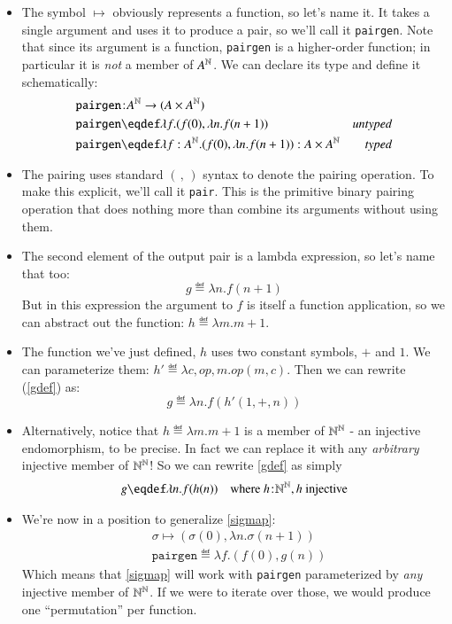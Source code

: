 \begin{itemize}
\item The symbol \(\mapsto\) obviously represents a function, so let's
  name it. It takes a single argument and uses it to produce a pair, so
  we'll call it \texttt{pairgen}. Note that since its argument is a
  function, \texttt{pairgen} is a higher-order function; in particular
  it is \textit{not} a member of \(A^{\mathbb{N}}\). We can declare its
  type and define it schematically:
  \begin{align*}
    & \tj{\texttt{pairgen}}{\exp{A}{\Nat}\fnarrow(A\times\exp{A}{\Nat})} \\
    & \texttt{pairgen}\eqdef\lambda{}f.(f(0),\lambda{}n.f(n+1)) & \textit{untyped} \\
    & \texttt{pairgen}\eqdef\lambda{}f:\exp{A}{\Nat}.(f(0),\lambda{}n.f(n+1)):A\times\exp{A}{\Nat} & \textit{typed}
  \end{align*}
\item The pairing uses standard \((\, ,\, )\) syntax to denote the pairing
  operation. To make this explicit, we'll call it \texttt{pair}. This
  is the primitive binary pairing operation that does nothing more
  than combine its arguments without using them.
\item The second element of the output pair is a lambda expression, so
  let's name that too:
  \begin{equation}
  g\eqdef\lambda{}n.f(n+1) \label{gdef}
  \end{equation}
  But in this expression the argument to \(f\) is itself a function
  application, so we can abstract out the function:
  \(h\eqdef\lambda{}m.m+1\).
\item The function we've just defined, \(h\) uses two constant
  symbols, \(+\) and \(1\). We can parameterize them:
  \(h'\eqdef\lambda{}c,op,m.op(m,c)\). Then we can rewrite (\ref{gdef}) as:
  \begin{equation}
    g\eqdef\lambda{}n.f(h'(1,+,n))
  \end{equation}
  \item Alternatively, notice that \(h\eqdef\lambda{}m.m+1\) is a
    member of \(\mathbb{N}^{\mathbb{N}}\) - an injective endomorphism, to be
    precise. In fact we can replace it with any \textit{arbitrary}
    injective member of \(\mathbb{N}^{\mathbb{N}}\)! So we can rewrite
    \ref{gdef} as simply
    \begin{align}
      & g\eqdef\lambda{}n.f(h(n))\hfill &
      \text{where}\ \tj{h}{\exp{\Nat}{\Nat}}, h\ \text{injective}
    \end{align}
  \item We're now in a position to generalize \ref{sigmap}:
    \begin{align}
      & \sigma\mapsto (\sigma(0), \lambda{}n.\sigma(n+1)) \\
      & \texttt{pairgen}\eqdef\lambda{}f.(f(0),g(n))
    \end{align}
    Which means that \ref{sigmap} will work with \texttt{pairgen}
    parameterized by \textit{any} injective member of
    \(\mathbb{N}^{\mathbb{N}}\). If we were to iterate over those, we would
    produce one ``permutation'' per function.
\end{itemize}

